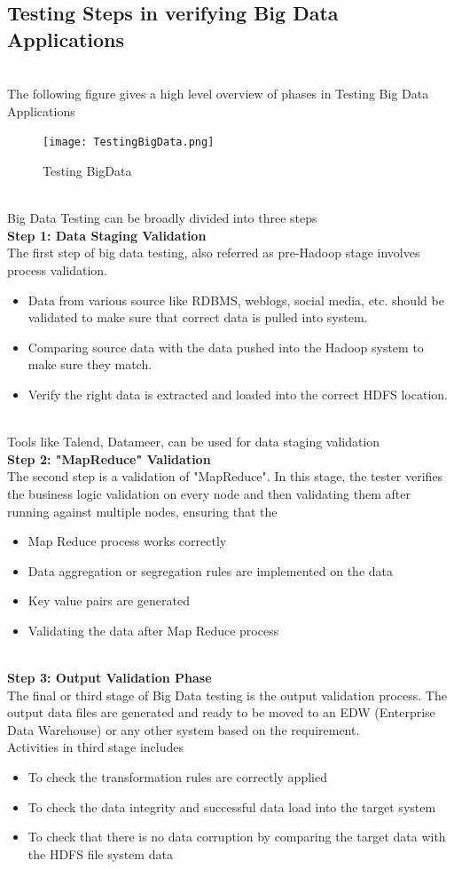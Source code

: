 \begin{itemize}
\subsection{Testing Steps in verifying Big Data Applications}
\\
The following figure gives a high level overview of phases in Testing Big Data Applications
\begin{figure}[h!]
	\centering
	\texttt{[image: TestingBigData.png]}
	\caption{Testing BigData}
\end{figure}
\\
Big Data Testing can be broadly divided into three steps
\\
\textbf{Step 1: Data Staging Validation}
\\
The first step of big data testing, also referred as pre-Hadoop stage involves process validation.
\begin{itemize}
	\item Data from various source like RDBMS, weblogs, social media, etc. should be validated to make sure that correct data is pulled into system.
	\item Comparing source data with the data pushed into the Hadoop system to make sure they match.
	\item Verify the right data is extracted and loaded into the correct HDFS location.
\end{itemize}
\\
Tools like Talend, Datameer, can be used for data staging validation
\\
\textbf{Step 2: "MapReduce" Validation}
\\
The second step is a validation of "MapReduce". In this stage, the tester verifies the business logic validation on every node and then validating them after running against multiple nodes, ensuring that the
	\begin{itemize}
		\item Map Reduce process works correctly
		\item Data aggregation or segregation rules are implemented on the data
		\item Key value pairs are generated
		\item Validating the data after Map Reduce process
	\end{itemize}
\\
\textbf{Step 3: Output Validation Phase}
\\
The final or third stage of Big Data testing is the output validation process. The output data files are generated and ready to be moved to an EDW (Enterprise Data Warehouse) or any other system based on the requirement.
\\
Activities in third stage includes
\begin{itemize}
	\item To check the transformation rules are correctly applied
	\item To check the data integrity and successful data load into the target system
	\item To check that there is no data corruption by comparing the target data with the HDFS file system data
\end{itemize}
\\

\end{itemize}
